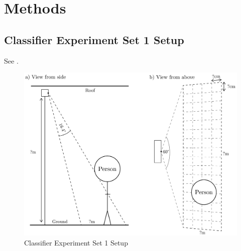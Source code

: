 \documentclass[../thesis/thesis.tex]{subfiles}
\begin{document}
 \chapter{Methods}

 \section{Classifier Experiment Set 1 Setup}
See .

\begin{landscape}
 \begin{figure}
 \centering
 \includegraphics[height=\textheight]{../diagrams/third-exp-setup2.pdf}
 \caption{Classifier Experiment Set 1 Setup}
 \label{fig:exps:3setup}
 \end{figure}
\end{landscape}

\end{document}
